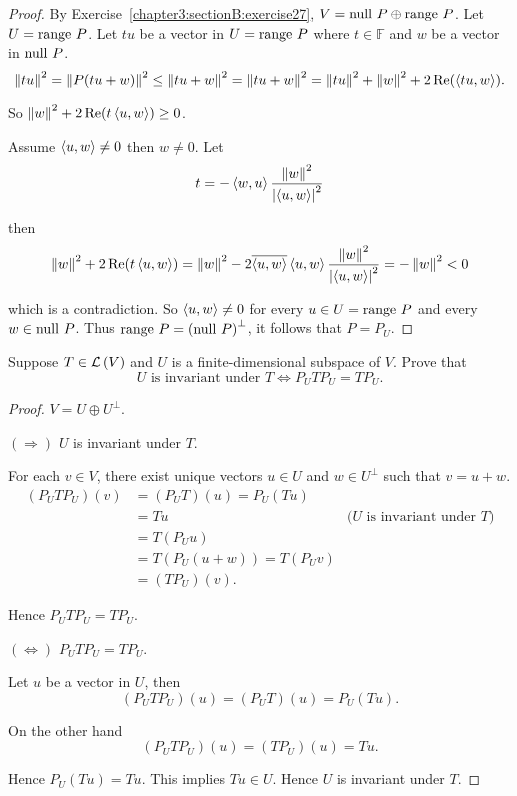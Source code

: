 \begin{proof}
    By Exercise~\ref{chapter3:sectionB:exercise27}, $V = \operatorname{null}\,{P}\oplus \operatorname{range}\,{P}$. Let $U = \operatorname{range}\,{P}$. Let $tu$ be a vector in $U = \operatorname{range}\,{P}$ where $t\in\mathbb{F}$ and $w$ be a vector in $\operatorname{null}\,{P}$.
    \[
        \left\Vert{tu}\right\Vert^{2} = \left\Vert{P(tu + w)}\right\Vert^{2} \leq \left\Vert{tu + w}\right\Vert^{2} = \left\Vert{tu + w}\right\Vert^{2} = \left\Vert{tu}\right\Vert^{2} + \left\Vert{w}\right\Vert^{2} + 2\operatorname{Re}(\left\langle{tu, w}\right\rangle).
    \]

    So $\left\Vert{w}\right\Vert^{2} + 2\operatorname{Re}(t\left\langle{u, w}\right\rangle)\geq 0$.

    Assume $\left\langle{u, w}\right\rangle\ne 0$ then $w\ne 0$. Let
    \[
        t = -\left\langle{w, u}\right\rangle\frac{\left\Vert{w}\right\Vert^{2}}{\left\vert{\left\langle{u, w}\right\rangle}\right\vert^{2}}
    \]

    then
    \[
        \left\Vert{w}\right\Vert^{2} + 2\operatorname{Re}(t\left\langle{u, w}\right\rangle) = \left\Vert{w}\right\Vert^{2} - 2\overline{\left\langle{u,w}\right\rangle}\left\langle{u,w}\right\rangle\frac{\left\Vert{w}\right\Vert^{2}}{\left\vert{\left\langle{u,w}\right\rangle}\right\vert^{2}} = -\left\Vert{w}\right\Vert^{2} < 0
    \]

    which is a contradiction. So $\left\langle{u, w}\right\rangle\ne 0$ for every $u\in U = \operatorname{range}\,{P}$ and every $w\in\operatorname{null}\,{P}$. Thus $\operatorname{range}\,{P} = {(\operatorname{null}\,{P})}^{\bot}$, it follows that $P = P_{U}$.
\end{proof}
\newpage

\begin{exercise}
    Suppose $T\in\mathcal{L}\left({V}\right)$ and $U$ is a finite-dimensional subspace of $V$. Prove that
    \[
        \text{$U$ is invariant under $T$} \Longleftrightarrow P_{U}TP_{U} = TP_{U}.
    \]
\end{exercise}

\begin{proof}
    $V = U\oplus U^{\bot}$.

    $(\Rightarrow)$ $U$ is invariant under $T$.

    For each $v\in V$, there exist unique vectors $u\in U$ and $w\in U^{\bot}$ such that $v = u + w$.
    \begin{align*}
        (P_{U}TP_{U})(v) & = (P_{U}T)(u) = P_{U}(Tu)                                           \\
                         & = Tu                          & \text{($U$ is invariant under $T$)} \\
                         & = T(P_{U}u)                                                         \\
                         & = T(P_{U}(u + w)) = T(P_{U}v)                                       \\
                         & = (TP_{U})(v).
    \end{align*}

    Hence $P_{U}TP_{U} = TP_{U}$.

    $(\Leftrightarrow)$ $P_{U}TP_{U} = TP_{U}$.

    Let $u$ be a vector in $U$, then
    \[
        (P_{U}TP_{U})(u) = (P_{U}T)(u) = P_{U}(Tu).
    \]

    On the other hand
    \[
        (P_{U}TP_{U})(u) = (TP_{U})(u) = Tu.
    \]

    Hence $P_{U}(Tu) = Tu$. This implies $Tu\in U$. Hence $U$ is invariant under $T$.
\end{proof}
\newpage

